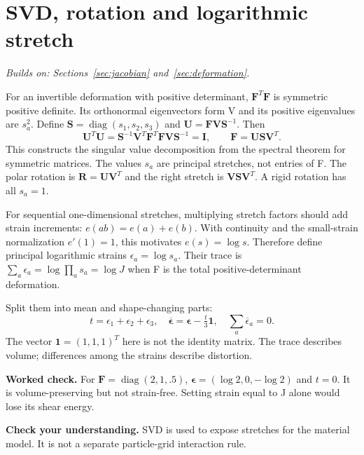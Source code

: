 \documentclass[11pt,a4paper]{article}
\newcommand{\mat}[1]{\mathbf{#1}}
\newcommand{\prereq}[1]{\textit{Builds on: #1}\par}
\newcommand{\checkpoint}[1]{\par\textbf{Check your understanding.} #1\par}
\DeclareMathOperator{\diag}{diag}
\numberwithin{equation}{section}
\begin{document}
\section{SVD, rotation and logarithmic stretch}\label{sec:svd}
\prereq{Sections~\ref{sec:jacobian} and~\ref{sec:deformation}.}
For an invertible deformation with positive determinant, $\mat F^T\mat F$ is
symmetric positive definite. Its orthonormal eigenvectors form V and its
positive eigenvalues are $s_a^2$. Define $\mat S=\diag(s_1,s_2,s_3)$ and
$\mat U=\mat F\mat V\mat S^{-1}$. Then
\[
\mat U^T\mat U=\mat S^{-1}\mat V^T\mat F^T\mat F\mat V\mat S^{-1}=\mat I,
\qquad \boxed{\mat F=\mat U\mat S\mat V^T}.
\]
This constructs the singular value decomposition from the spectral theorem for
symmetric matrices. The values $s_a$ are principal stretches, not entries of F.
The polar rotation is $\mat R=\mat U\mat V^T$ and the right stretch is
$\mat V\mat S\mat V^T$. A rigid rotation has all $s_a=1$.

For sequential one-dimensional stretches, multiplying stretch factors should
add strain increments: $e(ab)=e(a)+e(b)$. With continuity and the small-strain
normalization $e'(1)=1$, this motivates $e(s)=\log s$. Therefore define
principal logarithmic strains $\epsilon_a=\log s_a$.
Their trace is $\sum_a\epsilon_a=\log\prod_as_a=\log J$ when F is the total
positive-determinant deformation.

Split them into mean and shape-changing parts:
\begin{equation}\label{eq:dev-strain}
t=\epsilon_1+\epsilon_2+\epsilon_3,\quad
\overline{\boldsymbol\epsilon}=\boldsymbol\epsilon-\tfrac t3\mat1,
\quad \sum_a\overline\epsilon_a=0.
\end{equation}
The vector $\mat1=(1,1,1)^T$ here is not the identity matrix.
The trace describes volume; differences among the strains describe distortion.

\textbf{Worked check.} For $\mat F=\diag(2,1,.5)$,
$\boldsymbol\epsilon=(\log2,0,-\log2)$ and $t=0$. It is volume-preserving but
not strain-free. Setting strain equal to J alone would lose its shear energy.
\checkpoint{SVD is used to expose stretches for the material model. It is not
a separate particle-grid interaction rule.}
\end{document}
